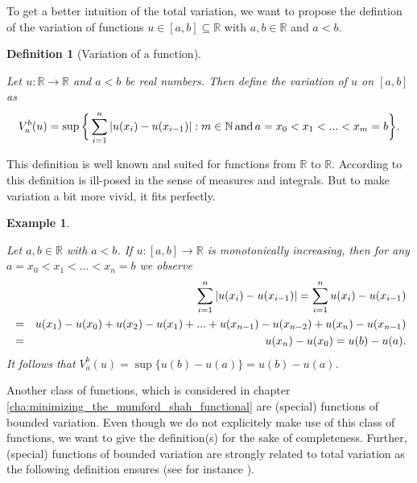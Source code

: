 \documentclass{scrreprt}
\newtheorem{definition}[theorem]{Definition}
\newtheorem{example}[theorem]{Example}
\begin{document}
        To get a better intuition of the total variation, we want to propose the defintion of the variation of functions $u \in [a, b] \subseteq \mathbb{R}$ with $a, b \in \mathbb{R}$ and $a < b$.

        \begin{definition}[Variation of a function] %
        \label{def:variation_of_a_function}

            Let $u: \mathbb{R} \longrightarrow \mathbb{R}$ and $a < b$ be real numbers. Then define the variation of $u$ on $[a, b]$ as
                $$
                    V^{b}_{a}(u) = \sup \bigg\{ \sum_{i = 1}^{n} |u(x_{i}) - u(x_{i - 1})| : m \in \mathbb{N} \,\textnormal{and}\, a = x_{0} < x_{1} < ... < x_{m} = b \bigg\}.
                $$

        \end{definition}

        This definition is well known and suited for functions from $\mathbb{R}$ to $\mathbb{R}$. According to \cite{Giusti} this definition is ill-posed in the sense of measures and integrals. But to make variation a bit more vivid, it fits perfectly.

        \begin{example} %
        \label{ex:total_variation_one_d}

            Let $a, b \in \mathbb{R}$ with $a < b$. If $u: [a, b] \longrightarrow \mathbb{R}$ is monotonically increasing, then for any $a = x_{0} < x_{1} < ... < x_{n} = b$ we observe
                \begin{eqnarray}
                    &&\sum_{i = 1}^{n} |u(x_{i}) - u(x_{i-1})| = \sum_{i = 1}^{n} u(x_{i}) - u(x_{i-1}) \notag \\
                    &=& u(x_{1}) - u(x_{0}) + u(x_{2}) - u(x_{1}) + ... + u(x_{n-1}) - u(x_{n-2}) + u(x_{n}) - u(x_{n-1}) \notag \\
                    &=& u(x_{n}) - u(x_{0}) = u(b) - u(a). \notag
                \end{eqnarray}
            It follows that $V^{b}_{a}(u) = \sup \{u(b) - u(a)\} = u(b) - u(a)$.

        \end{example}

        Another class of functions, which is considered in chapter \ref{cha:minimizing_the_mumford_shah_functional}
        are (special) functions of bounded variation. Even though we do not explicitely make use of this class of functions, we want to give the definition(s) for the sake of completeness. Further, (special) functions of bounded variation are strongly related to total variation as the following definition ensures (see for instance \cite{Giusti}).
\end{document}
